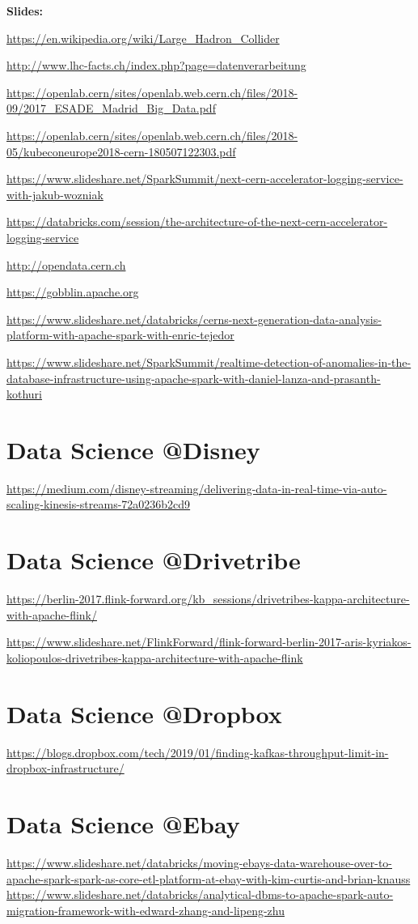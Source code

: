 \documentclass[12pt, numbers=noenddot]{scrreprt} %
\begin{document}
\textbf{Slides:}

\url{https://en.wikipedia.org/wiki/Large_Hadron_Collider}

\url{http://www.lhc-facts.ch/index.php?page=datenverarbeitung}

\url{https://openlab.cern/sites/openlab.web.cern.ch/files/2018-09/2017_ESADE_Madrid_Big_Data.pdf}

\url{https://openlab.cern/sites/openlab.web.cern.ch/files/2018-05/kubeconeurope2018-cern-180507122303.pdf}

\url{https://www.slideshare.net/SparkSummit/next-cern-accelerator-logging-service-with-jakub-wozniak}

\url{https://databricks.com/session/the-architecture-of-the-next-cern-accelerator-logging-service}

\url{http://opendata.cern.ch}

\url{https://gobblin.apache.org}

\url{https://www.slideshare.net/databricks/cerns-next-generation-data-analysis-platform-with-apache-spark-with-enric-tejedor}

\url{https://www.slideshare.net/SparkSummit/realtime-detection-of-anomalies-in-the-database-infrastructure-using-apache-spark-with-daniel-lanza-and-prasanth-kothuri}


\section{Data Science @Disney}
\url{https://medium.com/disney-streaming/delivering-data-in-real-time-via-auto-scaling-kinesis-streams-72a0236b2cd9}

\section{Data Science @Drivetribe}
\url{https://berlin-2017.flink-forward.org/kb_sessions/drivetribes-kappa-architecture-with-apache-flink/}

\url{https://www.slideshare.net/FlinkForward/flink-forward-berlin-2017-aris-kyriakos-koliopoulos-drivetribes-kappa-architecture-with-apache-flink}

\section{Data Science @Dropbox}
\url{https://blogs.dropbox.com/tech/2019/01/finding-kafkas-throughput-limit-in-dropbox-infrastructure/}

\section{Data Science @Ebay}
\url{https://www.slideshare.net/databricks/moving-ebays-data-warehouse-over-to-apache-spark-spark-as-core-etl-platform-at-ebay-with-kim-curtis-and-brian-knauss}
\url{https://www.slideshare.net/databricks/analytical-dbms-to-apache-spark-auto-migration-framework-with-edward-zhang-and-lipeng-zhu}
\end{document}
